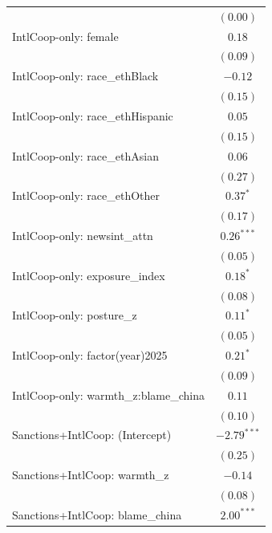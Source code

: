 \begin{tabular}{l c}
                                           & $(0.00)$      \\
IntlCoop-only: female                      & $0.18$        \\
                                           & $(0.09)$      \\
IntlCoop-only: race\_ethBlack              & $-0.12$       \\
                                           & $(0.15)$      \\
IntlCoop-only: race\_ethHispanic           & $0.05$        \\
                                           & $(0.15)$      \\
IntlCoop-only: race\_ethAsian              & $0.06$        \\
                                           & $(0.27)$      \\
IntlCoop-only: race\_ethOther              & $0.37^{*}$    \\
                                           & $(0.17)$      \\
IntlCoop-only: newsint\_attn               & $0.26^{***}$  \\
                                           & $(0.05)$      \\
IntlCoop-only: exposure\_index             & $0.18^{*}$    \\
                                           & $(0.08)$      \\
IntlCoop-only: posture\_z                  & $0.11^{*}$    \\
                                           & $(0.05)$      \\
IntlCoop-only: factor(year)2025            & $0.21^{*}$    \\
                                           & $(0.09)$      \\
IntlCoop-only: warmth\_z:blame\_china      & $0.11$        \\
                                           & $(0.10)$      \\
Sanctions+IntlCoop: (Intercept)            & $-2.79^{***}$ \\
                                           & $(0.25)$      \\
Sanctions+IntlCoop: warmth\_z              & $-0.14$       \\
                                           & $(0.08)$      \\
Sanctions+IntlCoop: blame\_china           & $2.00^{***}$  \\

\end{tabular}
